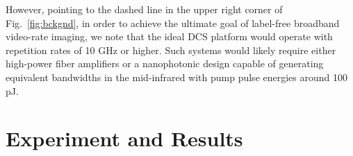 \documentclass{optica-article}
\begin{document}

However, pointing to the dashed line in the upper right corner of \mbox{Fig. \ref{fig:bckgnd}}, in order to achieve the ultimate goal of label-free broadband video-rate imaging, we note that the ideal DCS platform would operate with repetition rates of 10 GHz or higher. Such systems would likely require either high-power fiber amplifiers or a nanophotonic design capable of generating equivalent bandwidths in the mid-infrared with pump pulse energies around 100 pJ.





\section{Experiment and Results}

\end{document}
